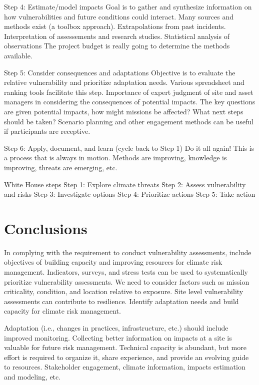 \documentclass[10pt]{amsart}
\begin{document}
Step 4: Estimate/model impacts
Goal is to gather and synthesize information on how vulnerabilities and future conditions could interact.
Many sources and methods exist (a toolbox approach).
Extrapolations from past incidents.
Interpretation of assessements and research studies.
Statistical analysis of observations
The project budget is really going to determine the methods available.
 
Step 5: Consider consequences and adaptations
Objective is to evaluate the relative vulnerability and prioritize adaptation needs.
Various spreadsheet and ranking tools facilitate this step.
Importance of expert judgment of site and asset managers in considering the consequences of potential impacts.
The key questions are given potential impacts, how might missions be affected?
What next steps should be taken?
Scenario planning and other engagement methods can be useful if participants are receptive.

Step 6: Apply, document, and learn (cycle back to Step 1)
Do it all again!
This is a process that is always in motion.
Methods are improving, knowledge is improving, threats are emerging, etc.

White House steps
Step 1: Explore climate threats
Step 2: Assess vulnerability and risks
Step 3: Investigate options
Step 4: Prioritize actions
Step 5: Take action

\section{Conclusions}
In complying with the requirement to conduct vulnerability assessments, include objectives of building capacity and improving resources for climate risk management.
Indicators, surveys, and stress tests can be used to systematically prioritize vulnerability assessments.
We need to consider factors such as mission criticality, condition, and location relative to exposure.
Site level vulnerability assessments can contribute to resilience.
Identify adaptation needs and build capacity for climate risk management.

Adaptation (i.e., changes in practices, infrastructure, etc.) should include improved monitoring.
Collecting better information on impacts at a site is valuable for future risk management.
Technical capacity is abundant, but more effort is required to organize it, share experience, and provide an evolving guide to resources.
Stakeholder engagement, climate information, impacts estimation and modeling, etc.



\newpage
\printbibliography
\end{document}

